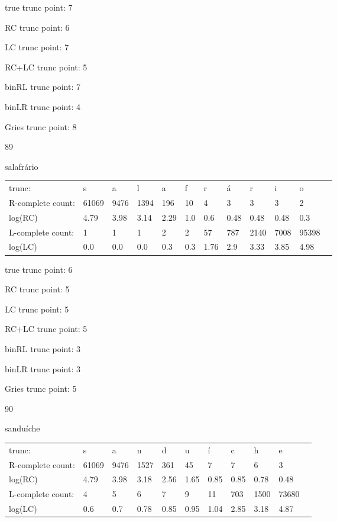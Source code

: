 \documentclass[10pt]{article}
\begin{document}
true trunc point: 7

RC trunc point: 6

LC trunc point: 7

RC+LC trunc point: 5

binRL trunc point: 7

binLR trunc point: 4

Gries trunc point: 8

\newpage

89

salafrário

\begin{tabular}{l|lllllllllll}
trunc: & s & a & l & a & f & r & á & r & i & o & \\ 
R-complete count: & 61069 & 9476 & 1394 & 196 & 10 & 4 & 3 & 3 & 3 & 2 & \\ 
log(RC) & 4.79 & 3.98 & 3.14 & 2.29 & 1.0 & 0.6 & 0.48 & 0.48 & 0.48 & 0.3 & \\ 
L-complete count: & 1 & 1 & 1 & 2 & 2 & 57 & 787 & 2140 & 7008 & 95398 & \\ 
log(LC) & 0.0 & 0.0 & 0.0 & 0.3 & 0.3 & 1.76 & 2.9 & 3.33 & 3.85 & 4.98 & \\ 
\end{tabular}

true trunc point: 6

RC trunc point: 5

LC trunc point: 5

RC+LC trunc point: 5

binRL trunc point: 3

binLR trunc point: 3

Gries trunc point: 5

\vspace{1em}

90

sanduíche

\begin{tabular}{l|llllllllll}
trunc: & s & a & n & d & u & í & c & h & e & \\ 
R-complete count: & 61069 & 9476 & 1527 & 361 & 45 & 7 & 7 & 6 & 3 & \\ 
log(RC) & 4.79 & 3.98 & 3.18 & 2.56 & 1.65 & 0.85 & 0.85 & 0.78 & 0.48 & \\ 
L-complete count: & 4 & 5 & 6 & 7 & 9 & 11 & 703 & 1500 & 73680 & \\ 
log(LC) & 0.6 & 0.7 & 0.78 & 0.85 & 0.95 & 1.04 & 2.85 & 3.18 & 4.87 & \\ 
\end{tabular}
\end{document}

